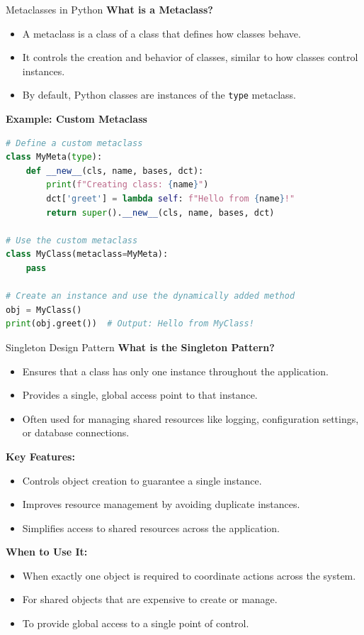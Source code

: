 \documentclass[10pt]{beamer}
\let\olditem\item
\renewcommand\item{\olditem\justifying}
\begin{document}
	\begin{frame}[fragile]{Metaclasses in Python}
		\textbf{What is a Metaclass?}
		\begin{itemize}
			\item A metaclass is a class of a class that defines how classes behave.
			\item It controls the creation and behavior of classes, similar to how classes control instances.
			\item By default, Python classes are instances of the \texttt{type} metaclass.
		\end{itemize}
	
		\textbf{Example: Custom Metaclass}
		\begin{lstlisting}[language=Python, caption=Defining and Using a Metaclass]
# Define a custom metaclass
class MyMeta(type):
	def __new__(cls, name, bases, dct):
		print(f"Creating class: {name}")
		dct['greet'] = lambda self: f"Hello from {name}!"
		return super().__new__(cls, name, bases, dct)

# Use the custom metaclass
class MyClass(metaclass=MyMeta):
	pass

# Create an instance and use the dynamically added method
obj = MyClass()
print(obj.greet())  # Output: Hello from MyClass!
		\end{lstlisting}
	\end{frame}
	
	
	
	\begin{frame}{Singleton Design Pattern}
		\textbf{What is the Singleton Pattern?}
		\begin{itemize}
			\item Ensures that a class has only one instance throughout the application.
			\item Provides a single, global access point to that instance.
			\item Often used for managing shared resources like logging, configuration settings, or database connections.
		\end{itemize}
		
		\textbf{Key Features:}
		\begin{itemize}
			\item Controls object creation to guarantee a single instance.
			\item Improves resource management by avoiding duplicate instances.
			\item Simplifies access to shared resources across the application.
		\end{itemize}
		
		\textbf{When to Use It:}
		\begin{itemize}
			\item When exactly one object is required to coordinate actions across the system.
			\item For shared objects that are expensive to create or manage.
			\item To provide global access to a single point of control.
		\end{itemize}
	\end{frame}
	
\end{document}
